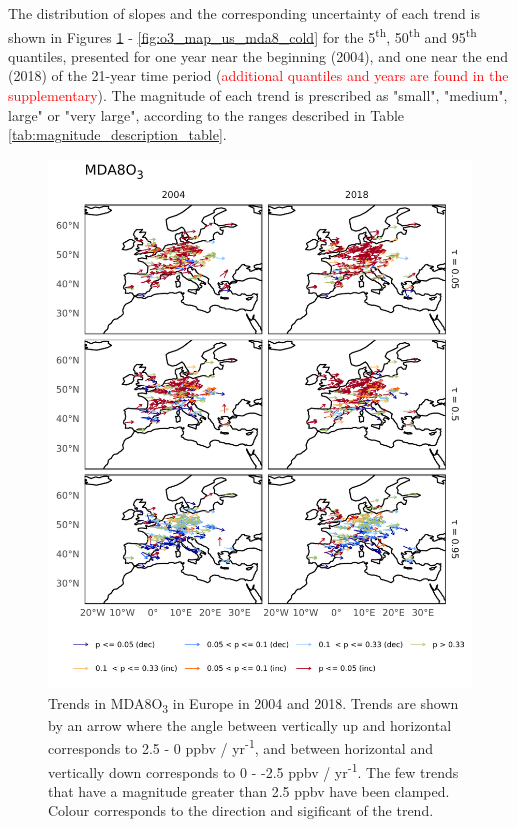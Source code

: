 \documentclass[journal abbreviation, manuscript]{copernicus}
\begin{document}
The distribution of slopes and the corresponding uncertainty of each trend is shown in Figures \ref{fig:o3_map_eu_mda8} - \ref{fig:o3_map_us_mda8_cold} for the 5\textsuperscript{th}, 50\textsuperscript{th} and 95\textsuperscript{th} quantiles, presented for one year near the beginning (2004), and one near the end (2018) of the 21-year time period (\textcolor{red}{additional quantiles and years are found in the supplementary}). The magnitude of each trend is prescribed as "small", "medium", large" or "very large", according to the ranges described in Table \ref{tab:magnitude_description_table}.

\begin{figure}[h!]
\centering
\includegraphics[height=0.9\textheight]{figures/paper_figures/o3_map/o3_map_piecewise_stats_freeTau_mda8_anom_all_eu_o3.pdf}
\caption{Trends in MDA8O\textsubscript{3} in Europe in 2004 and 2018. Trends are shown by an arrow where the angle between vertically up and horizontal corresponds to 2.5 - 0 ppbv / yr\textsuperscript{-1}, and between horizontal and vertically down corresponds to 0 - -2.5 ppbv / yr\textsuperscript{-1}. The few trends that have a magnitude greater than 2.5 ppbv have been clamped. Colour corresponds to the direction and sigificant of the trend.}
\label{fig:o3_map_eu_mda8}
\end{figure}
\end{document}
